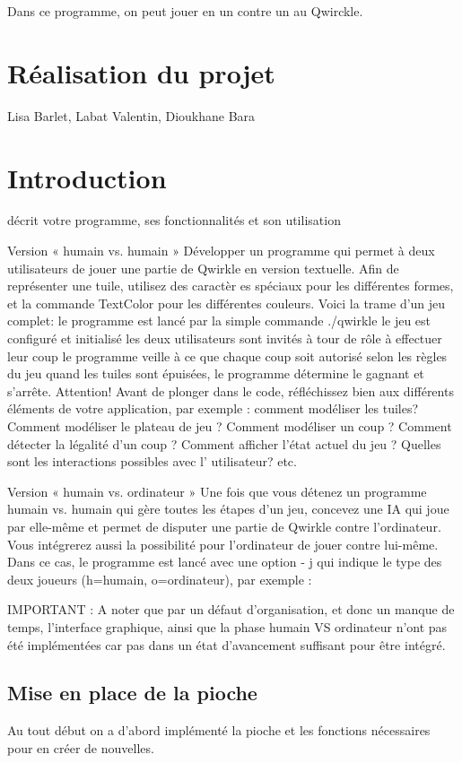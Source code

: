 Dans ce programme, on peut jouer en un contre un au Qwirckle.


\newpage
\section{Réalisation du projet}
Lisa Barlet, Labat Valentin, Dioukhane Bara
\section*{Introduction}
décrit votre programme, ses fonctionnalités et son utilisation

Version « humain vs. humain »
Développer un programme qui permet à deux utilisateurs de jouer
 une partie de Qwirkle en version 
textuelle. Afin de représenter une tuile, utilisez des caractèr
es spéciaux pour les différentes formes, 
et la commande 
TextColor
pour les différentes couleurs. Voici la trame d’un jeu complet:
le programme est lancé par la simple commande 
./qwirkle
le jeu est configuré et initialisé 
les deux utilisateurs sont invités à tour de rôle à effectuer leur coup 
le programme veille à ce que chaque coup soit autorisé selon les règles du jeu quand les tuiles sont épuisées, le programme détermine le gagnant et s’arrête. 
Attention!  Avant  de  plonger  dans  le  code,  réfléchissez  bien  aux différents  éléments  de  votre application, par exemple : comment modéliser les tuiles? Comment modéliser le plateau de jeu ? 
Comment  modéliser  un  coup  ?  Comment  détecter  la  légalité  d'un  coup  ?  Comment  afficher  l'état 
actuel du jeu ? Quelles sont les interactions possibles avec l’
utilisateur? etc.

Version « humain vs. ordinateur »
Une fois que vous détenez un programme humain vs. humain qui gère toutes les étapes d'un jeu, concevez  une  IA  qui  joue  par  elle-même  et  permet  de  disputer  une  partie  de  Qwirkle  contre l'ordinateur. Vous intégrerez aussi la possibilité pour l’ordinateur de jouer contre lui-même. Dans ce cas, le programme est lancé avec une option ‐
j qui indique le type des deux joueurs (h=humain, 
o=ordinateur), par exemple :

IMPORTANT : A noter que par un défaut d'organisation, et donc un manque de temps, l'interface graphique, ainsi que la phase humain VS ordinateur n'ont pas été implémentées car pas dans un état d'avancement suffisant pour être intégré.

\subsection{Mise en place de la pioche}
Au tout début on a d'abord implémenté la pioche et les fonctions nécessaires pour en créer de nouvelles.
